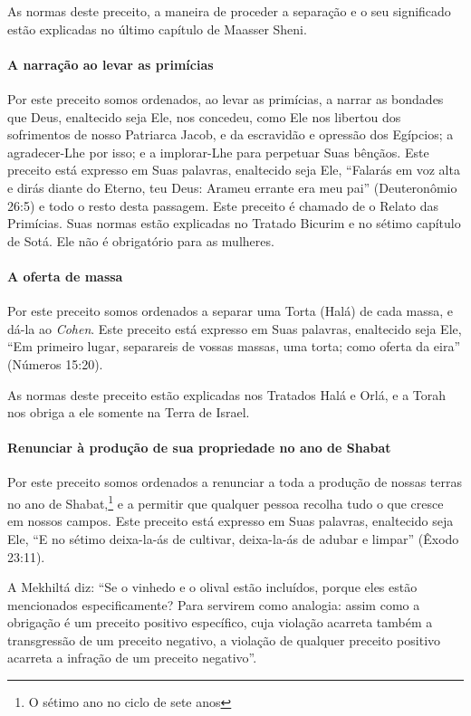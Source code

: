 As normas deste preceito, a maneira de proceder a separação e o seu
significado estão explicadas no último capítulo de Maasser Sheni.


\paragraph{A narração ao levar as primícias}

Por este preceito somos ordenados, ao levar as primícias, a narrar as
bondades que Deus, enaltecido seja Ele, nos concedeu, como Ele nos
libertou dos sofrimentos de nosso Patriarca Jacob, e da escravidão e
opressão dos Egípcios; a agradecer-Lhe por isso; e a implorar-Lhe para
perpetuar Suas bênçãos. Este preceito está expresso em Suas palavras,
enaltecido seja Ele, ``Falarás em voz alta e dirás diante do Eterno, teu
Deus: Arameu errante era meu pai'' (Deuteronômio 26:5) e todo o resto
desta passagem. Este preceito é chamado de o Relato das Primícias. Suas
normas estão explicadas no Tratado Bicurim e no sétimo capítulo de Sotá.
Ele não é obrigatório para as mulheres.

\paragraph{A oferta de massa}

Por este preceito somos ordenados a separar uma Torta (Halá) de cada
massa, e dá-la ao \textit{Cohen}. Este preceito está expresso em Suas
palavras, enaltecido seja Ele, ``Em primeiro lugar, separareis de vossas
massas, uma torta; como oferta da eira'' (Números 15:20).

As normas deste preceito estão explicadas nos Tratados Halá e Orlá, e a
Torah nos obriga a ele somente na Terra de Israel.

\paragraph{Renunciar à produção de sua propriedade no ano de Shabat}

Por este preceito somos ordenados a renunciar a toda a produção de
nossas terras no ano de Shabat,\footnote{O sétimo ano no ciclo de sete anos} e a permitir que
qualquer pessoa recolha tudo o que cresce em nossos campos. Este
preceito está expresso em Suas palavras, enaltecido seja Ele, ``E no
sétimo deixa-la-ás de cultivar, deixa-la-ás de adubar e limpar'' (Êxodo
23:11).

A Mekhiltá diz: ``Se o vinhedo e o olival estão incluídos, porque eles
estão mencionados especificamente? Para servirem como analogia: assim
como a obrigação é um preceito positivo específico, cuja violação
acarreta também a transgressão de um preceito negativo, a violação de
qualquer preceito positivo acarreta a infração de um preceito
negativo''.


